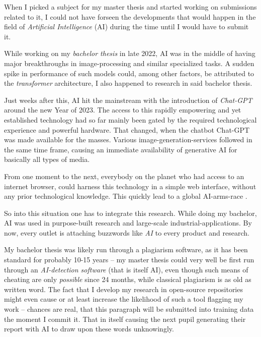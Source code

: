 When I picked a subject for my master thesis and started working on submissions related to it, I could not have forseen the developments that would happen in the field of \emph{Artificial Intelligence} (AI) during the time until I would have to submit it.

While working on my \emph{bachelor thesis} \cite{selfBachelorThesis} in late 2022, AI was in the middle of having major breakthroughs in image-processing and similar specialized tasks. 
A sudden spike in performance of such models could, among other factors, be attributed to the \emph{transformer} architecture, I also happened to research in said bachelor thesis.

Just weeks after this, AI hit the mainstream with the introduction of \emph{Chat-GPT} \cite{chatGPT} around the new Year of 2023.
The access to this rapidly empowering and yet established technology had so far mainly been gated by the required technological experience and powerful hardware. 
That changed, when the chatbot Chat-GPT was made available for the masses. 
Various image-generation-services followed in the same time frame, causing an immediate availability of generative AI for basically all types of media.

From one moment to the next, everybody on the planet who had access to an internet browser, could harness this technology in a simple web interface, without any prior technological knowledge. 
This quickly lead to a global AI-arms-race \cite{aiBoom}.


So into this situation one has to integrate this research. 
While doing my bachelor, AI was used in purpose-built research and large-scale industrial-applications.
By now, every outlet is attaching buzzwords like \emph{AI} to every product and research.

My bachelor thesis was likely run through a plagiarism software, as it has been standard for probably 10-15 years -- my master thesis could very well be first run through an \emph{AI-detection software} (that is itself \glqq AI\grqq), even though such means of cheating are only \emph{possible} since 24 months, while classical plagiarism is as old as written word.
The fact that I develop my research in open-source repositories might even cause or at least increase the likelihood of such a tool flagging my work -- chances are real, that this paragraph will be submitted into training data the moment I commit it.
That in itself causing the next pupil generating their report with AI to draw upon these words unknowingly.\\

